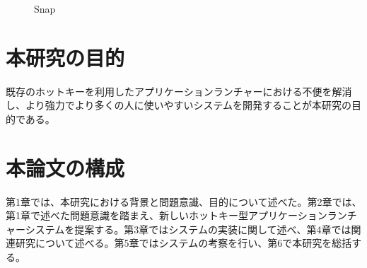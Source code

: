 \begin{figure}[h]
    \begin{center}
    \end{center}
    \caption{Snap}
    \label{fig:snap}
\end{figure}

\section{本研究の目的}

既存のホットキーを利用したアプリケーションランチャーにおける不便を解消し、より強力でより多くの人に使いやすいシステムを開発することが本研究の目的である。

\section{本論文の構成}

第1章では、本研究における背景と問題意識、目的について述べた。第2章では、第1章で述べた問題意識を踏まえ、新しいホットキー型アプリケーションランチャーシステムを提案する。第3章ではシステムの実装に関して述べ、第4章では関連研究について述べる。第5章ではシステムの考察を行い、第6で本研究を総括する。